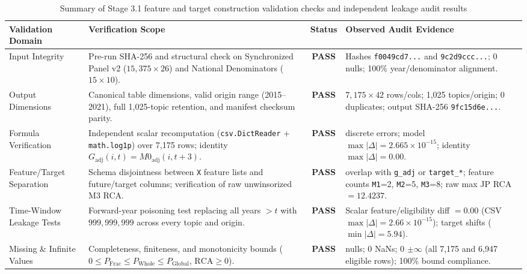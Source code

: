 \begin{table}[htbp]
\centering
\caption{Summary of Stage 3.1 feature and target construction validation checks and independent leakage audit results}
\label{tab:stage31-validation}
\footnotesize
\setlength{\tabcolsep}{4pt}
\begin{tabular}{>{\raggedright\arraybackslash}p{2.45cm} >{\raggedright\arraybackslash}p{4.85cm} c >{\raggedright\arraybackslash}p{5.15cm}}
\toprule
\textbf{Validation Domain} & \textbf{Verification Scope} & \textbf{Status} & \textbf{Observed Audit Evidence} \\
\midrule
Input Integrity & Pre-run SHA-256 and structural check on Synchronized Panel v2 ($15{,}375 \times 26$) and National Denominators ($15 \times 10$). & \textbf{PASS} & Hashes \texttt{f0049cd7...} and \texttt{9c2d9ccc...}; 0 nulls; 100\% year/denominator alignment. \\
\addlinespace[3pt]
Output Dimensions & Canonical table dimensions, valid origin range (2015--2021), full 1,025-topic retention, and manifest checksum parity. & \textbf{PASS} & $7{,}175 \times 42$ rows/cols; 1,025 topics/origin; 0 duplicates; output SHA-256 \texttt{9fc15d6e...}. \\
\addlinespace[3pt]
Formula Verification & Independent scalar recomputation (\texttt{csv.DictReader} + \texttt{math.log1p}) over 7,175 rows; identity $G_{\text{adj}}(i,t)=M0_{\text{adj}}(i,t+3)$. & \textbf{PASS} & 0 discrete errors; model $\max|\Delta|=2.665\times 10^{-15}$; identity $\max|\Delta|=0.00$. \\
\addlinespace[3pt]
Feature/Target Separation & Schema disjointness between \texttt{X} feature lists and future/target columns; verification of raw unwinsorized M3 RCA. & \textbf{PASS} & 0 overlap with \texttt{g\_adj} or \texttt{target\_*}; feature counts \texttt{M1}=2, \texttt{M2}=5, \texttt{M3}=8; raw max JP RCA $= 12.4237$. \\
\addlinespace[3pt]
Time-Window Leakage Tests & Forward-year poisoning test replacing all years $> t$ with $999{,}999{,}999$ across every topic and origin. & \textbf{PASS} & Scalar feature/eligibility diff $= 0.00$ (CSV $\max|\Delta|=2.66\times 10^{-15}$); target shifts ($\min|\Delta|=5.94$). \\
\addlinespace[3pt]
Missing \& Infinite Values & Completeness, finiteness, and monotonicity bounds ($0 \le P_{\text{Frac}} \le P_{\text{Whole}} \le P_{\text{Global}}$, $\text{RCA} \ge 0$). & \textbf{PASS} & 0 nulls; 0 NaNs; 0 $\pm\infty$ (all 7,175 and 6,947 eligible rows); 100\% bound compliance. \\

\end{tabular}
\end{table}
